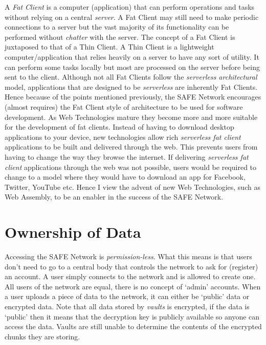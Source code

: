 A \textit{Fat Client} is a computer (application) that can perform operations and tasks without relying on a central \textit{server}. A Fat Client may still need to make periodic connections to a server but the vast majority of its functionality can be performed without \textit{chatter} with the server. The concept of a Fat Client is juxtaposed to that of a Thin Client. A Thin Client is a lightweight computer/application that relies heavily on a server to have any sort of utility. It can perform some tasks locally but most are processed on the server before being sent to the client. Although not all Fat Clients follow the \textit{serverless architectural} model, applications that are designed to be \textit{serverless} are inherently Fat Clients. Hence because of the points mentioned previously, the SAFE Network encourages (almost requires) the Fat Client style of architecture to be used for software development. As Web Technologies mature they become more and more suitable for the development of fat clients. Instead of having to download desktop applications to your device, new technologies allow rich \textit{serverless fat client} applications to be built and delivered through the web. This prevents users from having to change the way they browse the internet. If delivering \textit{serverless fat client} applications through the web was not possible, users would be required to change to a model where they would have to download an app for Facebook, Twitter, YouTube etc. Hence I view the advent of new Web Technologies, such as Web Assembly, to be an enabler in the success of the SAFE Network.

\section{Ownership of Data}

Accessing the SAFE Network is \textit{permission-less}. What this means is that users don't need to go to a central body that controls the network to ask for (register) an account. A user simply connects to the network and is allowed to create one. All users of the network are equal, there is no concept of `admin' accounts. When a user uploads a piece of data to the network, it can either be `public' data or encrypted data. Note that all data stored by \textit{vaults} is encrypted, if the data is `public' then it means that the decryption key is publicly available so anyone can access the data. Vaults are still unable to determine the contents of the encrypted chunks they are storing.

